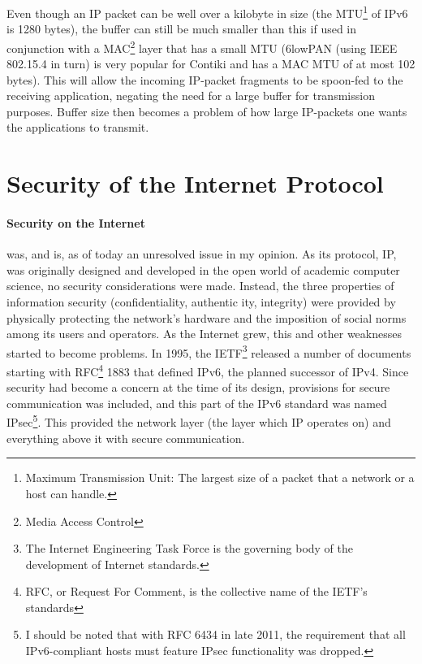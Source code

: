 \documentclass[final,a4paper,twoside,11pt,onecolumn]{report}
\begin{document}
Even though an IP packet can be well over a kilobyte in size (the MTU\footnote{Maximum Transmission Unit: The largest size of a packet that a network or a host can handle.} of IPv6 is 1280 bytes), the buffer can still be much smaller than this if used in conjunction with a MAC\footnote{Media Access Control} layer that has a small MTU (6lowPAN (using IEEE 802.15.4 in turn) is very popular for Contiki and has a MAC MTU of at most 102 bytes\citep[section 4]{rfc4944}). This will allow the incoming IP-packet fragments to be spoon-fed to the receiving application, negating the need for a large buffer for transmission purposes. Buffer size then becomes a problem of how large IP-packets one wants the applications to transmit.

\section{Security of the Internet Protocol}
\paragraph{Security on the Internet} was, and is, as of today an unresolved issue in my opinion. As its protocol, IP, was originally designed and developed in the open world of academic computer science, no security considerations were made. Instead, the three properties of information security (confidentiality, authentic ity, integrity) \citep[section 8.1]{vasseur10interconnecting} were provided by physically protecting the network's hardware and the imposition of social norms among its users and operators. As the Internet grew, this and other weaknesses started to become problems. In 1995, the IETF\footnote{The Internet Engineering Task Force is the governing body of the development of Internet standards.} released a number of documents starting with RFC\footnote{RFC, or Request For Comment, is the collective name of the IETF's standards} 1883\cite{rfc1883} that defined IPv6, the planned successor of IPv4. Since security had become a concern at the time of its design, provisions for secure communication was included, and this part of the IPv6 standard was named IPsec\footnote{I should be noted that with RFC 6434\cite{rfc6434} in late 2011, the requirement that all IPv6-compliant hosts must feature IPsec functionality was dropped.}. This provided the network layer (the layer which IP operates on) and everything above it with secure communication.
\end{document}
